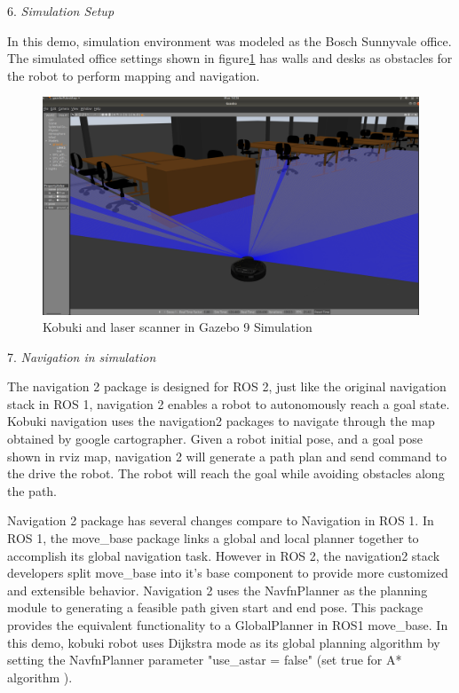 \documentclass[letterpaper, 10 pt, conference]{ieeeconf}  %
\begin{document}
6. \textit{Simulation Setup} \par\vspace{5pt} 
In this demo, simulation environment was modeled as the Bosch Sunnyvale office. The simulated office settings shown in figure\ref{fig:gazebo} has walls and desks as obstacles for the robot to perform mapping and navigation. \par\vspace{5pt} 
\begin{figure}[htp!]
  \includegraphics[width=\linewidth]{gazebo_simulation.png}
  \caption{Kobuki and laser scanner in Gazebo 9 Simulation } 
  \label{fig:gazebo}
\end{figure}

7. \textit{Navigation in simulation} \par\vspace{5pt} 
The navigation 2 package is designed for ROS 2, just like the original navigation stack in ROS 1, navigation 2 enables a robot to autonomously reach a goal state. Kobuki navigation uses the navigation2 packages to navigate through the map obtained by google cartographer. Given a robot initial pose, and a goal pose shown in rviz map, navigation 2 will generate a path plan and send command to the drive the robot. The robot will reach the goal while avoiding obstacles along the path. 

Navigation 2 package has several changes compare to Navigation in ROS 1. In ROS 1, the move\_base package links a global and local planner together to accomplish its global navigation task\cite{c8}. However in ROS 2, the navigation2 stack developers split move\_base into it's base component to provide more customized and extensible behavior. Navigation 2 uses the NavfnPlanner as the planning module to generating a feasible path given start and end pose. This package provides the equivalent functionality to a GlobalPlanner in ROS1 move\_base. In this demo, kobuki robot uses Dijkstra mode as its global planning algorithm by setting the NavfnPlanner parameter "use\_astar = false" (set true for A* algorithm ). 
\end{document}
